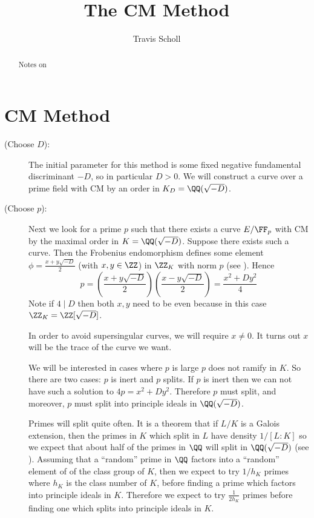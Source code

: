 \documentclass[11pt]{article}
\newcommand{\mytitle}{The CM Method}
\newcommand{\myauthor}{Travis Scholl}
\begin{document}
\title{\mytitle}
\author{\sc \myauthor }
\maketitle

\begin{abstract}
	Notes on \cite{blake1999elliptic}
\end{abstract}

\section{CM Method}

\begin{description}
	\item[(Choose $D$):]
	
	The initial parameter for this method is some fixed negative fundamental discriminant $-D$, so in particular $D>0$. We will construct a curve over a prime field with CM by an order in $K_D = \QQ(\sqrt{-D})$.
	
	\item[(Choose $p$):]
	
	Next we look for a prime $p$ such that there exists a curve $E/\FF_p$ with CM by the maximal order in $K = \QQ(\sqrt{-D})$. Suppose there exists such a curve. Then the Frobenius endomorphism defines some element $\phi = \frac{x+y\sqrt{-D}}{2}$ (with $x,y\in\ZZ$) in $\ZZ_K$ with norm $p$ (see \cite[Thm.~V.2.3.1]{silverman2009arithmetic}). Hence
	$$
	p
	= \left(\frac{x + y\sqrt{-D}}{2}\right)\left(\frac{x - y\sqrt{-D}}{2}\right)
	= \frac{x^2 + Dy^2}{4}
	$$
	Note if $4 \mid D$ then both $x,y$ need to be even because in this case $\ZZ_K = \ZZ[\sqrt{-D}]$.
	
	In order to avoid supersingular curves, we will require $x\neq 0$. It turns out $x$ will be the trace of the curve we want.
	
	We will be interested in cases where $p$ is large $p$ does not ramify in $K$. So there are two cases: $p$ is inert and $p$ splits. If $p$ is inert then we can not have such a solution to $4p = x^2 + Dy^2$. Therefore $p$ must split, and moreover, $p$ must split into principle ideals in $\QQ(\sqrt{-D})$.

	\begin{rem}
		Primes will split quite often. It is a theorem that if $L/K$ is a Galois extension, then the primes in $K$ which split in $L$ have density $1/[L:K]$ so we expect that about half of the primes in $\QQ$ will split in $\QQ(\sqrt{-D})$ (see \cite[Cor.~8.32]{milneANT}).
		Assuming that a ``random'' prime in $\QQ$ factors into a ``random'' element of of the class group of $K$, then we expect to try $1/h_K$ primes where $h_K$ is the class number of $K$, before finding a prime which factors into principle ideals in $K$. Therefore we expect to try $\frac{1}{2h_K}$ primes before finding one which splits into principle ideals in $K$.
	\end{rem}
	

\end{description}
\end{document}
